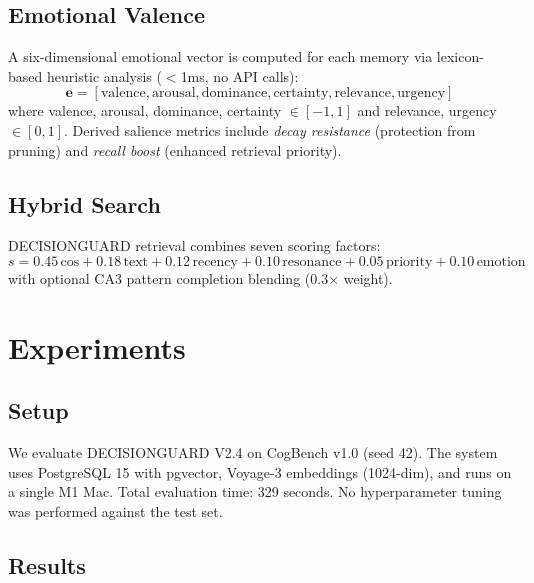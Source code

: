 \documentclass{article}
\begin{document}
\subsection{Emotional Valence}

A six-dimensional emotional vector is computed for each memory via lexicon-based heuristic analysis ($<$1ms, no API calls):
\begin{equation}
\mathbf{e} = [\text{valence}, \text{arousal}, \text{dominance}, \text{certainty}, \text{relevance}, \text{urgency}]
\end{equation}
where valence, arousal, dominance, certainty $\in [-1, 1]$ and relevance, urgency $\in [0, 1]$. Derived salience metrics include \emph{decay resistance} (protection from pruning) and \emph{recall boost} (enhanced retrieval priority).

\subsection{Hybrid Search}

DECISIONGUARD retrieval combines seven scoring factors:
\begin{equation}
s = 0.45\,\text{cos} + 0.18\,\text{text} + 0.12\,\text{recency} + 0.10\,\text{resonance} + 0.05\,\text{priority} + 0.10\,\text{emotion}
\end{equation}
with optional CA3 pattern completion blending (0.3$\times$ weight).

\section{Experiments}
\label{sec:experiments}

\subsection{Setup}

We evaluate DECISIONGUARD V2.4 on CogBench v1.0 (seed 42). The system uses PostgreSQL 15 with pgvector, Voyage-3 embeddings (1024-dim), and runs on a single M1 Mac. Total evaluation time: 329 seconds. No hyperparameter tuning was performed against the test set.

\subsection{Results}
\end{document}
